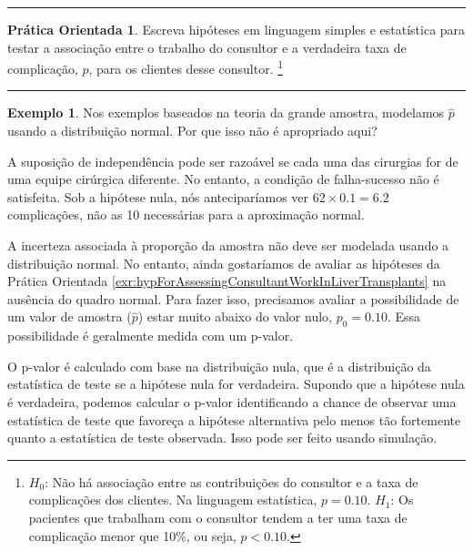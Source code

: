 \documentclass[
]{book}
\theoremstyle{definition}
\theoremstyle{definition}
\newtheorem{example}{Exemplo}[chapter]
\theoremstyle{definition}
\newtheorem{exercise}{Prática Orientada}[chapter]
\theoremstyle{definition}
\theoremstyle{remark}
\begin{document}
\begin{center}\rule{0.5\linewidth}{0.5pt}\end{center}

\begin{exercise}
\protect\hypertarget{exr:hypForAssessingConsultantWorkInLiverTransplants}{}{\label{exr:hypForAssessingConsultantWorkInLiverTransplants} }Escreva hipóteses em linguagem simples e estatística para testar a associação entre o trabalho do consultor e a verdadeira taxa de complicação, \(p\), para os clientes desse consultor. \footnote{\(H_0\): Não há associação entre as contribuições do consultor e a taxa de complicações dos clientes. Na linguagem estatística, \(p = 0.10\). \(H_1\): Os pacientes que trabalham com o consultor tendem a ter uma taxa de complicação menor que 10\%, ou seja, \(p < 0.10\).}
\end{exercise}

\begin{center}\rule{0.5\linewidth}{0.5pt}\end{center}

\begin{example}
\protect\hypertarget{exm:unnamed-chunk-258}{}{\label{exm:unnamed-chunk-258} }Nos exemplos baseados na teoria da grande amostra, modelamos \(\hat{p}\) usando a distribuição normal. Por que isso não é apropriado aqui?
\end{example}

A suposição de independência pode ser razoável se cada uma das cirurgias for de uma equipe cirúrgica diferente. No entanto, a condição de falha-sucesso não é satisfeita. Sob a hipótese nula, nós anteciparíamos ver \(62 \times 0.1=6.2\) complicações, não as 10 necessárias para a aproximação normal.

A incerteza associada à proporção da amostra não deve ser modelada usando a distribuição normal. No entanto, ainda gostaríamos de avaliar as hipóteses da Prática Orientada \ref{exr:hypForAssessingConsultantWorkInLiverTransplants} na ausência do quadro normal. Para fazer isso, precisamos avaliar a possibilidade de um valor de amostra (\(\hat{p}\)) estar muito abaixo do valor nulo, \(p_0 = 0.10\). Essa possibilidade é geralmente medida com um p-valor.

O p-valor é calculado com base na distribuição nula, que é a distribuição da estatística de teste se a hipótese nula for verdadeira. Supondo que a hipótese nula é verdadeira, podemos calcular o p-valor identificando a chance de observar uma estatística de teste que favoreça a hipótese alternativa pelo menos tão fortemente quanto a estatística de teste observada. Isso pode ser feito usando simulação.
\end{document}
